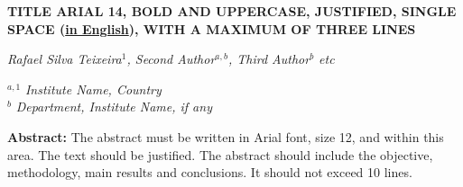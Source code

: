 \documentclass[
	article,			%
	12pt,				%
	oneside,			%
	a4paper,			%
	english,			%
	brazil,				%
	sumario=tradicional
	]{abntex2}
\begin{document}
\pagestyle{meuestilo}

\frenchspacing 


%
%


\pretextual
\pagestyle{meuestilo}




   \vspace*{2pt}

   \noindent
   \textbf{\large{TITLE ARIAL 14, BOLD AND UPPERCASE, JUSTIFIED, SINGLE SPACE (\underline{in English}), WITH A MAXIMUM OF THREE LINES}}
   
   \vspace{\onelineskip}
   \noindent
   \textit{
      Rafael Silva Teixeira$^1$, Second Author$^{a,b}$, Third Author$^b$ etc
   }
   \vspace{\onelineskip}

   \noindent
   $^{a, 1}$ \textit{Institute Name, Country}\\
   $^b$ \textit{Department, Institute Name, if any}

   \vspace*{1.2cm}
   \noindent
   \normalsize
   \textbf{Abstract:} The abstract must be written in Arial font, size 12, and within this area. The text should be justified. The abstract should include the objective, methodology, main results and conclusions. It should not exceed 10 lines.
\end{document}
